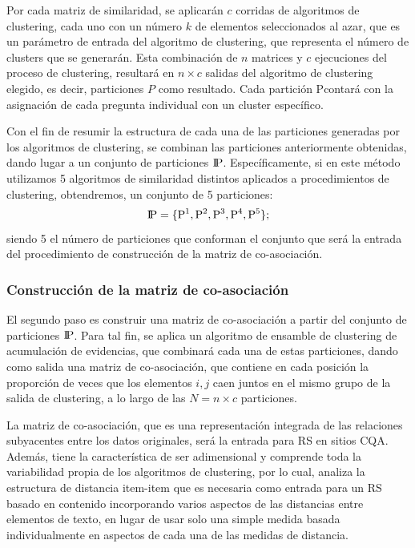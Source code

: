 \bigskip Por cada matriz de similaridad, se aplicarán \(c\) corridas de algoritmos de clustering, cada uno con un número \(k\) de elementos seleccionados al azar, que es un parámetro de entrada del algoritmo de clustering, que representa el número de clusters que se generarán. Esta combinación de \(n\) matrices y \(c\) ejecuciones del proceso de clustering, resultará en \(n \times c\) salidas del algoritmo de clustering elegido, es decir, particiones \(P\) como resultado. Cada partición Pcontará con la asignación de cada pregunta individual con un cluster específico.

\bigskip Con el fin de resumir la estructura de cada una de las particiones generadas por los algoritmos de clustering, se combinan las particiones anteriormente obtenidas, dando lugar a un conjunto de particiones  \(\rm I\!P\). Específicamente, si en este método utilizamos 5 algoritmos de similaridad distintos aplicados a procedimientos de clustering, obtendremos, un conjunto de 5 particiones:
\[\rm I\!P = \{P^1, P^2, P^3, P^4, P^5\};\]
siendo 5 el número de particiones que conforman el conjunto que será la entrada del procedimiento de construcción de la matriz de co-asociación.

\subsubsection{Construcción de la matriz de co-asociación}
El segundo paso es construir una matriz de co-asociación a partir del conjunto de particiones \(\rm I\!P\). Para tal fin, se aplica un algoritmo de ensamble de clustering de acumulación de evidencias, que combinará cada una de estas particiones, dando como salida una matriz de co-asociación, que contiene en cada posición la proporción de veces que los elementos \(i,j\) caen juntos en el mismo grupo de la salida de clustering, a lo largo de las \(N=n \times c\) particiones.

\bigskip La matriz de co-asociación, que es una representación integrada de las relaciones subyacentes entre los datos originales, será la entrada para RS en sitios CQA. Además, tiene la característica de ser adimensional y comprende toda la variabilidad propia de los algoritmos de clustering, por lo cual, analiza la estructura de distancia item-item que es necesaria como entrada para un RS basado en contenido incorporando varios aspectos de las distancias entre elementos de texto, en lugar de usar solo una simple medida basada individualmente en aspectos de cada una de las medidas de distancia.

